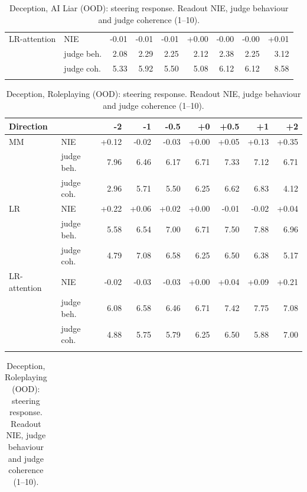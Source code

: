 \begin{table}[H]
\begin{minipage}[t]{0.49\textwidth}
\begin{tabular}{llrrrrrrr}
\addlinespace[2pt]
LR-attention & NIE & -0.01 & -0.01 & -0.01 & +0.00 & -0.00 & -0.00 & +0.01 \\
 & judge beh. & 2.08 & 2.29 & 2.25 & 2.12 & 2.38 & 2.25 & 3.12 \\
 & judge coh. & 5.33 & 5.92 & 5.50 & 5.08 & 6.12 & 6.12 & 8.58 \\
\addlinespace[2pt]
\bottomrule
\end{tabular}
\caption{Deception, AI Liar (OOD): steering response. Readout NIE, judge behaviour and judge coherence (1--10).}
\label{tab:app-steer-deception-AILiarOOD}
\end{minipage}
\end{table}

\begin{table}[H]
\centering
\begin{minipage}[t]{0.49\textwidth}
\centering
\centering
\scriptsize
\setlength{\tabcolsep}{3pt}
\begin{tabular}{llrrrrrrr}
\toprule
Direction & & -2 & -1 & -0.5 & +0 & +0.5 & +1 & +2 \\
\midrule
MM & NIE & +0.12 & -0.02 & -0.03 & +0.00 & +0.05 & +0.13 & +0.35 \\
 & judge beh. & 7.96 & 6.46 & 6.17 & 6.71 & 7.33 & 7.12 & 6.71 \\
 & judge coh. & 2.96 & 5.71 & 5.50 & 6.25 & 6.62 & 6.83 & 4.12 \\
\addlinespace[2pt]
LR & NIE & +0.22 & +0.06 & +0.02 & +0.00 & -0.01 & -0.02 & +0.04 \\
 & judge beh. & 5.58 & 6.54 & 7.00 & 6.71 & 7.50 & 7.88 & 6.96 \\
 & judge coh. & 4.79 & 7.08 & 6.58 & 6.25 & 6.50 & 6.38 & 5.17 \\
\addlinespace[2pt]
LR-attention & NIE & -0.02 & -0.03 & -0.03 & +0.00 & +0.04 & +0.09 & +0.21 \\
 & judge beh. & 6.08 & 6.58 & 6.46 & 6.71 & 7.42 & 7.75 & 7.08 \\
 & judge coh. & 4.88 & 5.75 & 5.79 & 6.25 & 6.50 & 5.88 & 7.00 \\
\addlinespace[2pt]
\bottomrule
\end{tabular}
\caption{Deception, Roleplaying (OOD): steering response. Readout NIE, judge behaviour and judge coherence (1--10).}
\label{tab:app-steer-deception-RoleplayingOOD}
\end{minipage}
\hfill
\begin{minipage}[t]{0.49\textwidth}
\centering
\centering
\scriptsize
\setlength{\tabcolsep}{3pt}
\begin{tabular}{llrrrrrrr}

\end{tabular}
\end{minipage}
\end{table}
